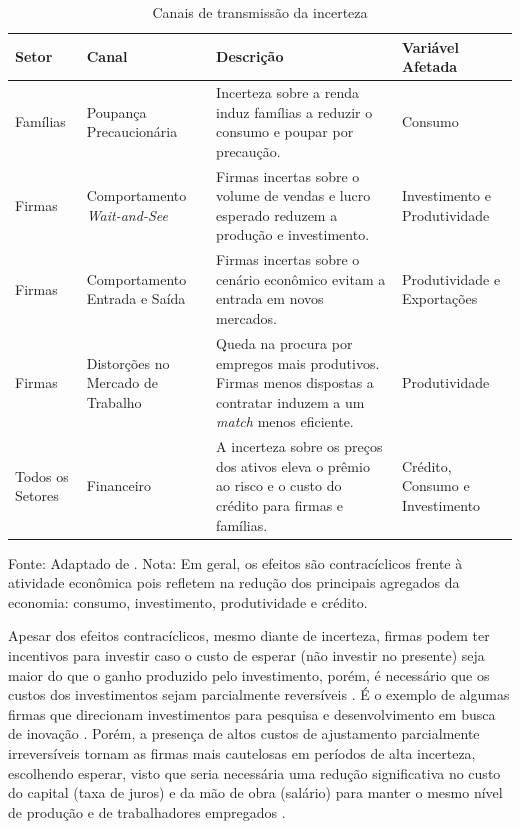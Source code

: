 \begin{table}[htb!]
\caption{Canais de transmissão da incerteza}
\label{table:canais_de_transmissao}
\vspace{0.25cm}
\small
\begin{center}
\begin{tabular}{
    >{\raggedright\arraybackslash}m{1.75cm} 
    >{\raggedright\arraybackslash}m{3.25cm} 
    m{5.6cm}  
    >{\raggedright\arraybackslash}m{2.75cm}}
\hline
Setor& Canal& Descrição& Variável Afetada\\
\hline
Famílias& Poupança Precaucionária & Incerteza sobre a renda induz famílias a reduzir o consumo e poupar por precaução.& Consumo\\ [4ex]

Firmas&Comportamento \textit{Wait-and-See}&Firmas incertas sobre o volume de vendas e lucro esperado reduzem a produção e investimento.& Investimento e Produtividade\\ [4ex]

Firmas& Comportamento Entrada e Saída&Firmas incertas sobre o cenário econômico evitam a entrada em novos mercados.& Produtividade e Exportações\\ [4ex]

Firmas& Distorções no Mercado de Trabalho & Queda na procura por empregos mais produtivos. Firmas menos dispostas a contratar induzem a um \textit{match} menos eficiente. & Produtividade\\ [5ex]

Todos os Setores & Financeiro& A incerteza sobre os preços dos ativos eleva o prêmio ao risco e o custo do crédito para firmas e famílias.& Crédito, Consumo e Investimento\\ \hline
\end{tabular}
\end{center}
Fonte: Adaptado de . \newline
Nota: Em geral, os efeitos são contracíclicos frente à atividade econômica pois refletem na redução dos principais agregados da economia: consumo, investimento, produtividade e crédito.
\end{table}
\par

Apesar dos efeitos contracíclicos, mesmo diante de incerteza, firmas podem ter incentivos para investir caso o custo de esperar (não investir no presente) seja maior do que o ganho produzido pelo investimento, porém, é necessário que os custos dos investimentos sejam parcialmente reversíveis \cite{bernanke1983irreversibility}. É o exemplo de algumas firmas que direcionam investimentos para pesquisa e desenvolvimento em busca de inovação \cite{bloom2014fluctuations}. Porém, a presença de altos custos de ajustamento parcialmente irreversíveis tornam as firmas mais cautelosas em períodos de alta incerteza, escolhendo esperar, visto que seria necessária uma redução significativa no custo do capital (taxa de juros) e da mão de obra (salário) para manter o mesmo nível de produção e de trabalhadores empregados \cite{bloom2009impact}.
\par

